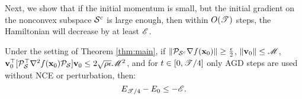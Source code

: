 Next, we show that if the initial momentum is small, but the initial gradient on the nonconvex subspace $\S^c$ is large enough, then within $O(\utime)$ steps, the Hamiltonian will decrease by at least $\ufun$.





\begin{lemma}\label{lem:largegrad_nonconvex}
Under the setting of Theorem \ref{thm:main}, if $\norm{\proj_{\S^c}\grad f(\x_{0})} \ge \frac{\epsilon}{2}$, $\norm{\v_0} \le \umom$, $\v_0\trans [\proj_{\S}\trans\hess f(\x_0) \proj_{\S}] \v_0 \le  2 \sqrt{\rho\epsilon}\umom^2 $,
and for $t\in [0, \utime/4]$ only AGD steps are used without NCE or perturbation,
then:
\begin{equation*}
E_{\utime/4} - E_0 \le - \ufun.
\end{equation*}
\end{lemma}

